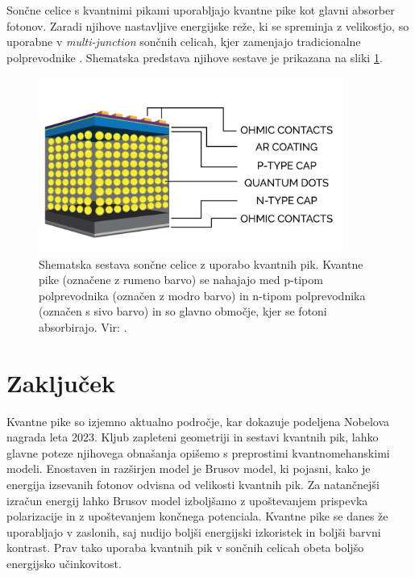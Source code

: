\documentclass[twoside,11pt]{article}
\begin{document}
Sončne celice s kvantnimi pikami uporabljajo kvantne pike kot glavni absorber fotonov. Zaradi njihove nastavljive energijske reže, ki se spreminja z velikostjo, so uporabne v \textit{multi-junction} sončnih celicah,
kjer zamenjajo tradicionalne polprevodnike \cite{sinovoltaics}. Shematska predstava njihove sestave je prikazana na sliki \ref{fig:QD_solar_cell}.
\begin{figure}[H]
   \begin{center}
       \includegraphics[width=10cm]{figures/QD_solar_cell.png}
       \caption{Shematska sestava sončne celice z uporabo kvantnih pik. Kvantne pike (označene z rumeno barvo) se nahajajo med p-tipom polprevodnika (označen z modro barvo) in n-tipom polprevodnika (označen s sivo barvo) in so glavno območje, kjer se fotoni absorbirajo. Vir: \cite{sinovoltaics}.}
       \label{fig:QD_solar_cell}
   \end{center}
\end{figure}

\section{Zaključek}
Kvantne pike so izjemno aktualno področje, kar dokazuje podeljena Nobelova nagrada leta 2023. Kljub zapleteni geometriji in sestavi kvantnih pik, lahko glavne poteze njihovega obnašanja opišemo s preprostimi kvantnomehanskimi modeli. 
Enostaven in razširjen model je Brusov model, ki pojasni, kako je energija izsevanih fotonov odvisna od velikosti kvantnih pik.
Za natančnejši izračun energij lahko Brusov model izboljšamo z upoštevanjem prispevka polarizacije in z upoštevanjem končnega potenciala. 
Kvantne pike se danes že uporabljajo v zaslonih, saj nudijo boljši energijski izkoristek in boljši barvni kontrast. 
Prav tako uporaba kvantnih pik v sončnih celicah obeta boljšo energijsko učinkovitost.



\end{document}
